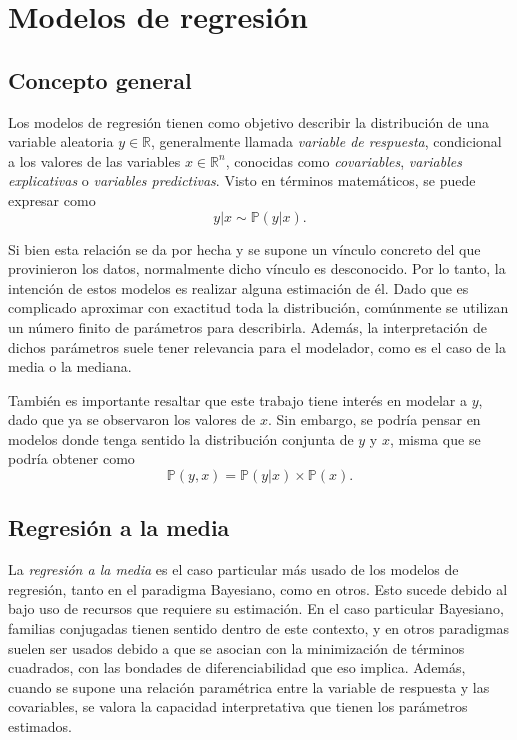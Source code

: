 \chapter[Modelos de regresi\'on]{Modelos de regresi\'on}

\section{Concepto general}

Los modelos de regresi\'on tienen como objetivo describir la distribuci\'on de una variable aleatoria $y \in \mathbb{R}$, generalmente llamada \textit{variable de respuesta}, condicional a los valores de las variables $x \in \mathbb{R}^n$, conocidas como \textit{covariables}, \textit{variables explicativas} o \textit{variables predictivas}. Visto en t\'erminos matem\'aticos, se puede expresar como
\begin{equation*}
    y|x \sim \mathbb{P}(y|x).
\end{equation*}

Si bien esta relaci\'on se da por hecha y se supone un v\'inculo concreto del que provinieron los datos, normalmente dicho v\'inculo es desconocido. Por lo tanto, la intenci\'on de estos modelos es realizar alguna estimaci\'on de \'el. Dado que es complicado aproximar con exactitud toda la distribuci\'on, com\'unmente se utilizan un n\'umero finito de par\'ametros para describirla. Adem\'as, la interpretaci\'on de dichos par\'ametros suele tener relevancia para el modelador, como es el caso de la media o la mediana. 

Tambi\'en es importante resaltar que este trabajo tiene inter\'es en modelar a $y$, dado que ya se observaron los valores de $x$. Sin embargo, se podr\'ia pensar en modelos donde tenga sentido la distribuci\'on conjunta de $y$ y $x$, misma que se podr\'ia obtener como
\begin{equation*}
    \mathbb{P}(y,x) = \mathbb{P}(y|x) \times \mathbb{P}(x).
\end{equation*}

\section{Regresión a la media}

La \textit{regresi\'on a la media} es el caso particular m\'as usado de los modelos de regresi\'on, tanto en el paradigma Bayesiano, como en otros. Esto sucede debido al bajo uso de recursos que requiere su estimaci\'on. En el caso particular Bayesiano, familias conjugadas tienen sentido dentro de este contexto, y en otros paradigmas suelen ser usados debido a que se asocian con la minimizaci\'on de t\'erminos cuadrados, con las bondades de diferenciabilidad que eso implica. Adem\'as, cuando se supone una relaci\'on param\'etrica entre la variable de respuesta y las covariables, se valora la capacidad interpretativa que tienen los par\'ametros estimados.

